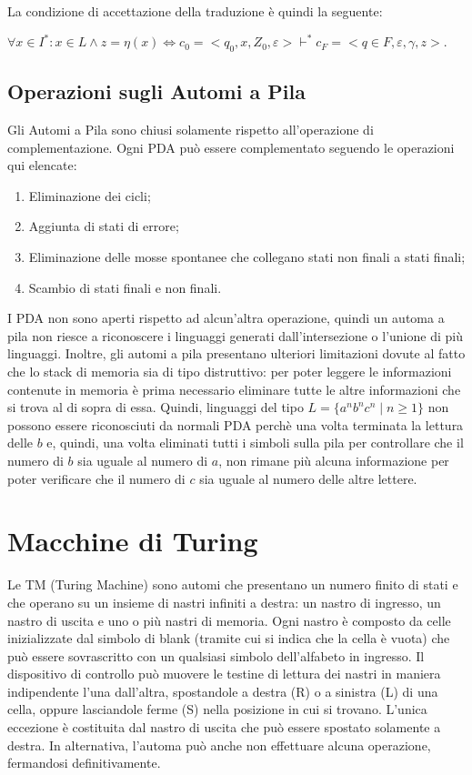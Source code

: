   La condizione di accettazione della traduzione è quindi la seguente:

  \begin{math}
    \forall x \in I^* : x \in L \wedge z = \eta(x) \iff c_0 = <q_0, x, Z_0, \varepsilon> \vdash ^* c_F=<q\in F, \varepsilon, \gamma, z>.
  \end{math}

  \subsection{Operazioni sugli Automi a Pila}
  Gli Automi a Pila sono chiusi solamente rispetto all'operazione di complementazione. Ogni PDA può essere complementato seguendo le operazioni qui elencate:
  \begin{enumerate}
    \item Eliminazione dei cicli;
    \item Aggiunta di stati di errore;
    \item Eliminazione delle mosse spontanee che collegano stati non finali a stati finali;
    \item Scambio di stati finali e non finali.
  \end{enumerate}


  I PDA non sono aperti rispetto ad alcun'altra operazione, quindi un automa a pila non riesce a riconoscere i linguaggi generati dall'intersezione o l'unione di più linguaggi. Inoltre, gli automi a pila presentano ulteriori limitazioni dovute al fatto che lo stack di memoria sia di tipo distruttivo: per poter leggere le informazioni contenute in memoria è prima necessario eliminare tutte le altre informazioni che si trova al di sopra di essa. Quindi, linguaggi del tipo \(L=\{a^nb^nc^n\;|\;n\geq 1\}\) non possono essere riconosciuti da normali PDA perchè una volta terminata la lettura delle \(b\) e, quindi, una volta eliminati tutti i simboli sulla pila per controllare che il numero di \(b\) sia uguale al numero di \(a\), non rimane più alcuna informazione per poter verificare che il numero di \(c\) sia uguale al numero delle altre lettere.

  \section{Macchine di Turing}  
  Le TM (Turing Machine) sono automi che presentano un numero finito di stati  e che operano su un insieme di nastri infiniti a destra: un nastro di ingresso, un nastro di uscita e uno o più nastri di memoria. Ogni nastro è composto da celle inizializzate dal simbolo di blank (tramite cui si indica che la cella è vuota) che può essere sovrascritto con un qualsiasi simbolo dell'alfabeto in ingresso. Il dispositivo di controllo può muovere le testine di lettura dei nastri in maniera indipendente l'una dall'altra, spostandole a destra (R) o a sinistra (L) di una cella, oppure lasciandole ferme (S) nella posizione in cui si trovano. L'unica eccezione è costituita dal nastro di uscita che può essere spostato solamente a destra. In alternativa, l'automa può anche non effettuare alcuna operazione, fermandosi definitivamente. 
  
